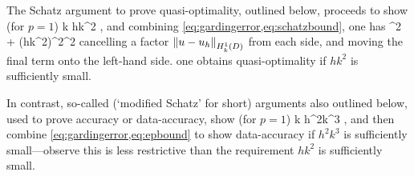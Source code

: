 The Schatz argument to prove quasi-optimality, outlined below, proceeds to show (for $p=1$)
\beq\label{eq:schatzbound}
k \lesssim hk^2 ,
\eeq
and combining \cref{eq:gardingerror,eq:schatzbound}, one has
\beqs
{}^2 \lesssim {} + \mleft(hk^2\mright)^2^2
\eeqs
cancelling a factor $\NHokD{u-\uh}$ from each side, and moving the final term onto the left-hand side. one obtains quasi-optimality if $hk^2$ is sufficiently small.

In contrast, so-called  (`modified Schatz' for short) arguments also outlined below, used to prove accuracy or data-accuracy, show (for $p=1$)
\beq\label{eq:epbound}
k \lesssim h^2k^3 ,
\eeq
and then combine \cref{eq:gardingerror,eq:epbound} to show data-accuracy if $h^2k^3$ is sufficiently small---observe this is less restrictive than the requirement $hk^2$ is sufficiently small.

